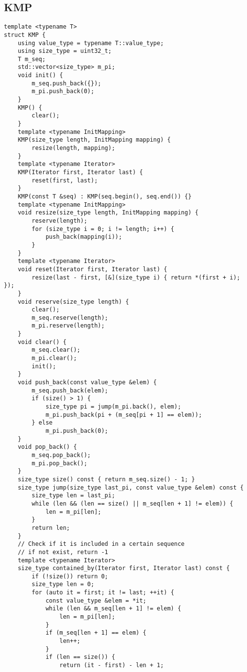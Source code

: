 \subsection{KMP}
\begin{lstlisting}
template <typename T>
struct KMP {
    using value_type = typename T::value_type;
    using size_type = uint32_t;
    T m_seq;
    std::vector<size_type> m_pi;
    void init() {
        m_seq.push_back({});
        m_pi.push_back(0);
    }
    KMP() {
        clear();
    }
    template <typename InitMapping>
    KMP(size_type length, InitMapping mapping) {
        resize(length, mapping); 
    }
    template <typename Iterator>
    KMP(Iterator first, Iterator last) {
        reset(first, last); 
    }
    KMP(const T &seq) : KMP(seq.begin(), seq.end()) {}
    template <typename InitMapping>
    void resize(size_type length, InitMapping mapping) {
        reserve(length);
        for (size_type i = 0; i != length; i++) {
            push_back(mapping(i));
        }
    }
    template <typename Iterator>
    void reset(Iterator first, Iterator last) {
        resize(last - first, [&](size_type i) { return *(first + i); });
    }
    void reserve(size_type length) {
        clear();
        m_seq.reserve(length);
        m_pi.reserve(length); 
    }
    void clear() {
        m_seq.clear();
        m_pi.clear();
        init();
    }
    void push_back(const value_type &elem) {
        m_seq.push_back(elem);
        if (size() > 1) {
            size_type pi = jump(m_pi.back(), elem);
            m_pi.push_back(pi + (m_seq[pi + 1] == elem));
        } else
            m_pi.push_back(0);
    }
    void pop_back() {
        m_seq.pop_back();
        m_pi.pop_back();
    }
    size_type size() const { return m_seq.size() - 1; }
    size_type jump(size_type last_pi, const value_type &elem) const {
        size_type len = last_pi;
        while (len && (len == size() || m_seq[len + 1] != elem)) { 
            len = m_pi[len];
        }
        return len;
    }
    // Check if it is included in a certain sequence
    // if not exist, return -1
    template <typename Iterator>
    size_type contained_by(Iterator first, Iterator last) const {
        if (!size()) return 0;
        size_type len = 0;
        for (auto it = first; it != last; ++it) {
            const value_type &elem = *it;
            while (len && m_seq[len + 1] != elem) {
                len = m_pi[len];
            }
            if (m_seq[len + 1] == elem) { 
                len++;
            }
            if (len == size()) {
                return (it - first) - len + 1;

\end{lstlisting}
